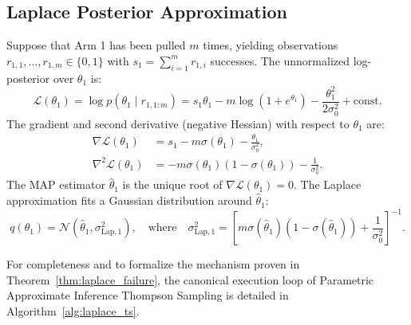 \documentclass[twoside]{article}
\begin{document}
\subsection{Laplace Posterior Approximation}
Suppose that Arm 1 has been pulled $m$ times, yielding observations $r_{1,1}, \dots, r_{1,m} \in \{0, 1\}$ with $s_1 = \sum_{i=1}^m r_{1,i}$ successes. The unnormalized log-posterior over $\theta_1$ is:
\begin{equation}
\mathcal{L}(\theta_1) = \log p(\theta_1 \mid r_{1,1:m}) = s_1 \theta_1 - m \log(1 + e^{\theta_1}) - \frac{\theta_1^2}{2\sigma_0^2} + \text{const}.
\end{equation}
The gradient and second derivative (negative Hessian) with respect to $\theta_1$ are:
\begin{align}
\nabla \mathcal{L}(\theta_1) &= s_1 - m \sigma(\theta_1) - \frac{\theta_1}{\sigma_0^2}, \\
\nabla^2 \mathcal{L}(\theta_1) &= - m \sigma(\theta_1)(1 - \sigma(\theta_1)) - \frac{1}{\sigma_0^2}.
\end{align}
The MAP estimator $\hat{\theta}_1$ is the unique root of $\nabla \mathcal{L}(\theta_1) = 0$. The Laplace approximation fits a Gaussian distribution around $\hat{\theta}_1$:
\begin{equation}
q(\theta_1) = \mathcal{N}(\hat{\theta}_1, \sigma_{\text{Lap}, 1}^2), \quad \text{where} \quad \sigma_{\text{Lap}, 1}^2 = \left[ m \sigma(\hat{\theta}_1)(1 - \sigma(\hat{\theta}_1)) + \frac{1}{\sigma_0^2} \right]^{-1}.
\end{equation}

For completeness and to formalize the mechanism proven in Theorem~\ref{thm:laplace_failure}, the canonical execution loop of Parametric Approximate Inference Thompson Sampling is detailed in Algorithm~\ref{alg:laplace_ts}.
\end{document}
